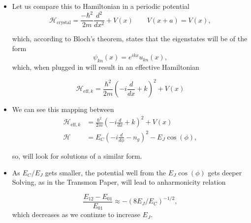 \begin{itemize}
\item Let us compare this to Hamiltonian in a periodic potential
  \begin{equation}
    \mathcal{H}_\text{crystal} = \frac{-\hbar^2}{2m}\frac{d^2}{dx^2}+V(x)\qquad V(x+a) = V(x),
  \end{equation}

  \noindent  which, according  to  Bloch's theorem,  states that  the
  eigenstates will be of the form
  \begin{equation}
    \psi_{kn}(x) = e^{ikx}u_{kn}(x),
  \end{equation}
  \noindent  which,  when plugged  in  will  result in  an  effective
  Hamiltonian

  \begin{equation}
    \mathcal{H}_{\text{eff},k} = \frac{\hbar^2}{2m}\left(-i\frac{d}{dx}+k\right)^2 + V(x)
  \end{equation}
\item We can see this mapping between
  \begin{equation}
    \begin{aligned}
      \mathcal{H}_{\text{eff},k} & = \frac{\hbar^2}{2m}\left(-i\frac{d}{dx}+k\right)^2 + V(x)\\
      \mathcal{H}  & =  E_C\left(-i\frac{d}{d\phi}  - n_g\right)^2  -
      E_J\cos(\phi),
    \end{aligned}
  \end{equation}

  \noindent so, will look for solutions of a similar form.
\item  As $  E_C/E_J  $ gets  smaller, the  potential  well from  the
  $ E_J\cos(\phi) $ gets deeper  
  Solving,  as in  the  Transmon Paper,  will  lead to  anharmonicity
  relation

  \begin{framed}\noindent
    \begin{equation}       \frac{E_{12}      -       E_{01}}{E_{01}}\approx
      -(8E_J/E_C)^{-1/2},
    \end{equation}
    \noindent which decreases as we continue to increase $ E_J $.
  \end{framed}
\end{itemize}
\newpage

